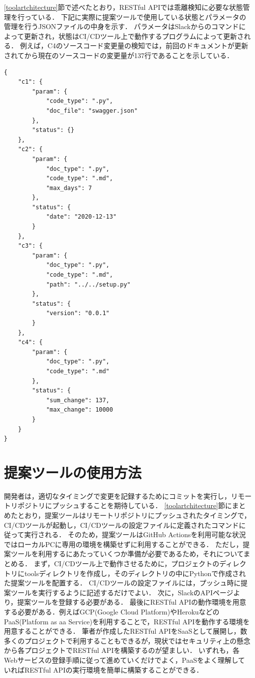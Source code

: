 \ref{toolartchitecture}節で述べたとおり，RESTful APIでは乖離検知に必要な状態管理を行っている．
下記に実際に提案ツールで使用している状態とパラメータの管理を行うJSONファイルの中身を示す．
パラメータはSlackからのコマンドによって更新され，状態はCI/CDツール上で動作するプログラムによって更新される．
例えば，C4のソースコード変更量の検知では，前回のドキュメントが更新されてから現在のソースコードの変更量が137行であることを示している．
\begin{lstlisting}[caption=状態とパラメメータの管理の例, label=status]
{
    "c1": {
        "param": {
            "code_type": ".py",
            "doc_file": "swagger.json"
        },
        "status": {}
    },
    "c2": {
        "param": {
            "doc_type": ".py",
            "code_type": ".md",
            "max_days": 7
        },
        "status": {
            "date": "2020-12-13"
        }
    },
    "c3": {
        "param": {
            "doc_type": ".py",
            "code_type": ".md",
            "path": "../../setup.py"
        },
        "status": {
            "version": "0.0.1"
        }
    },
    "c4": {
        "param": {
            "doc_type": ".py",
            "code_type": ".md"
        },
        "status": {
            "sum_change": 137,
            "max_change": 10000
        }
    }
}
\end{lstlisting}
    

\section{提案ツールの使用方法}
開発者は，適切なタイミングで変更を記録するためにコミットを実行し，リモートリポジトリにプッシュすることを期待している．
\ref{toolartchitecture}節にまとめたとおり，提案ツールはリモートリポジトリにプッシュされたタイミングで，CI/CDツールが起動し，CI/CDツールの設定ファイルに定義されたコマンドに従って実行される．
そのため，提案ツールはGitHub Actionsを利用可能な状況ではローカルPCに専用の環境を構築せずに利用することができる．
ただし，提案ツールを利用するにあたっていくつか準備が必要であるため，それについてまとめる．
まず，CI/CDツール上で動作させるために，プロジェクトのディレクトリにtoolsディレクトリを作成し，そのディレクトリの中にPythonで作成された提案ツールを配置する．
CI/CDツールの設定ファイルには，プッシュ時に提案ツールを実行するように記述するだけでよい．
次に，SlackのAPIページより，提案ツールを登録する必要がある．
最後にRESTful APIの動作環境を用意する必要がある．例えばGCP(Google Cloud Platform)\cite{gcp}やHeroku\cite{heroku}などのPaaS(Platform as aa Service)を利用することで，RESTful APIを動作する環境を用意することができる．
筆者が作成したRESTful APIをSaaSとして展開し，数多くのプロジェクトで利用することもできるが，現状ではセキュリティ上の懸念から各プロジェクトでRESTful APIを構築するのが望ましい．
いずれも，各Webサービスの登録手順に従って進めていくだけでよく，PaaSをよく理解していればRESTful APIの実行環境を簡単に構築することができる．


